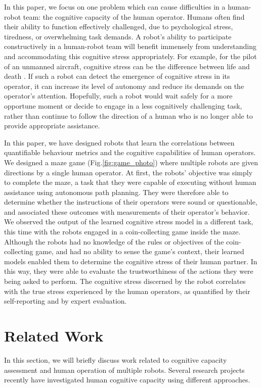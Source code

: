 \documentclass{sig-alternate}
\begin{document}
In this paper, we focus on one problem which can cause difficulties in
a human-robot team: the cognitive capacity of the human operator.
Humans often find their ability to function effectively challenged,
due to psychological stress, tiredness, or overwhelming task demands.
A robot's ability to participate constructively in a human-robot team
will benefit immensely from understanding and accommodating this
cognitive stress appropriately.  For example, for the pilot of an
unmanned aircraft, cognitive stress can be the difference between life
and death \cite{crandall2005validating}.  If such a robot can detect
the emergence of cognitive stress in its operator, it can increase its
level of autonomy and reduce its demands on the operator's attention.
Hopefully, such a robot would wait safely for a more opportune moment
or decide to engage in a less cognitively challenging task, rather
than continue to follow the direction of a human who is no longer able
to provide appropriate assistance.

In this paper, we have designed robots that learn the correlations
between quantifiable behaviour metrics and the cognitive capabilities
of human operators.  We designed a maze game
(Fig.\ref{fig:game_photo}) where multiple robots are given directions
by a single human operator.  At first, the robots' objective was
simply to complete the maze, a task that they were capable of
executing without human assistance using autonomous path planning.
They were therefore able to determine whether the instructions of
their operators were sound or questionable, and associated these
outcomes with measurements of their operator's behavior.  We observed
the output of the learned cognitive stress model in a different task,
this time with the robots engaged in a coin-collecting game inside the
maze.  Although the robots had no knowledge of the rules or objectives
of the coin-collecting game, and had no ability to sense the game's
context, their learned models enabled them to determine the cognitive
stress of their human partner.  In this way, they were able to
evaluate the trustworthiness of the actions they were being asked to
perform.  The cognitive stress discerned by the robot correlates with
the true stress experienced by the human operators, as quantified by
their self-reporting and by expert evaluation.

\section{Related Work}
In this section, we will briefly discuss work related to cognitive
capacity assessment and human operation of multiple robots.  Several
research projects recently have investigated human cognitive capacity
using different approaches.
\end{document}
